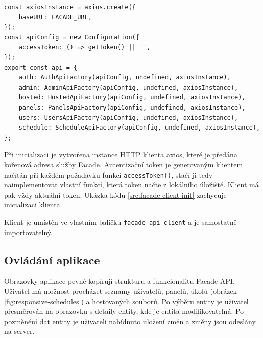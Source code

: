 \begin{lstlisting}[label=src:facade-client-init,caption={Inicializace Facade API klienta}]
const axiosInstance = axios.create({
	baseURL: FACADE_URL,
});
const apiConfig = new Configuration({
	accessToken: () => getToken() || '',
});
export const api = {
	auth: AuthApiFactory(apiConfig, undefined, axiosInstance),
	admin: AdminApiFactory(apiConfig, undefined, axiosInstance),
	hosted: HostedApiFactory(apiConfig, undefined, axiosInstance),
	panels: PanelsApiFactory(apiConfig, undefined, axiosInstance),
	users: UsersApiFactory(apiConfig, undefined, axiosInstance),
	schedule: ScheduleApiFactory(apiConfig, undefined, axiosInstance),
};
\end{lstlisting}

Při inicializaci je vytvořena instance HTTP klienta axios\cite{AxiosAxios2024}, které je předána kořenová adresa služby Facade. Autentizační token je generovaným klientem načítán při každém požadavku funkcí \lstinline|accessToken()|, stačí ji tedy naimplementovat vlastní funkcí, která token načte z lokálního úložiště. Klient má pak vždy aktuální token. Ukázka kódu \ref{src:facade-client-init} zachycuje inicializaci klienta.

Klient je umístěn ve vlastním balíčku \lstinline|facade-api-client| a je samostatně importovatelný.

\subsection{Ovládání aplikace}
Obrazovky aplikace pevně kopírují strukturu a funkcionalitu Facade API. Uživatel má možnost procházet seznamy uživatelů, panelů, úkolů (obrázek \ref{fig:responsive-schedules}) a hostovaných souborů. Po výběru entity je uživatel přesměrován na obrazovku s detaily entity, kde je entita modifikovatelná. Po pozměnění dat entity je uživateli nabídnuto uložení změn a změny jsou odeslány na server.

